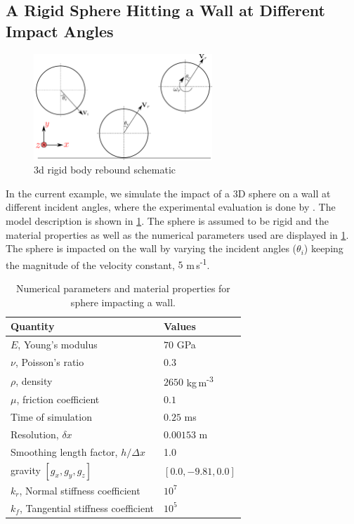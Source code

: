 \subsection{A Rigid Sphere Hitting a Wall at Different Impact Angles}
\label{sec:r-vyas}
\begin{figure}[!htpb]
  \centering
  \includegraphics[width=0.6\textwidth]{images/csph/images/vyas_2021_rebound_kinematics_3d/schematic}
  \caption{3d rigid body rebound schematic}
\label{fig:results-vyas-3d-rebound-schematic}
\end{figure}
In the current example, we simulate the impact of a 3D sphere on a wall at
different incident angles, where the experimental evaluation is done by
\textcite{thornton2011investigation}. The model description is shown in
\cref{fig:results-vyas-3d-rebound-schematic}. The sphere is assumed to be
rigid and the material properties as well as the numerical parameters used are
displayed in \cref{tab:sphere-wall-impact}. The sphere is impacted on the wall
by varying the incident angles ($\theta_i$) keeping the magnitude of the
velocity constant, $5$ m\,s\textsuperscript{-1}.
\begin{table}[!ht]
  \centering
  \begin{tabular}[!ht]{ll}
    \toprule
    Quantity & Values\\
    \midrule
    $E$, Young's modulus & $70$ GPa \\
    $\nu$, Poisson's ratio & $0.3$ \\
    $\rho$, density & $2650$ kg\,m\textsuperscript{-3} \\
    $\mu$, friction coefficient & $0.1$ \\
    Time of simulation & $0.25$ ms \\
    Resolution, $\delta x$ & $0.00153$ m\\
    Smoothing length factor, $h/\Delta x$ & 1.0\\
    gravity $[g_x, g_y, g_z]$ & $[0.0, -9.81, 0.0]$\\
    $k_r$, Normal stiffness coefficient & $10^{7}$ \\
    $k_f$, Tangential stiffness coefficient & $10^{5}$ \\
    \bottomrule
  \end{tabular}
  \caption{Numerical parameters and material properties for sphere impacting a wall.}%
  \label{tab:sphere-wall-impact}
\end{table}

